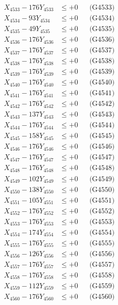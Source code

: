 \documentclass[a4paper,10pt]{article}
\begin{document}
{\begin{align}
X_{4533} - 176Y_{4533} &\leq +0 && \text{(G4533)} \\
X_{4534} - 93Y_{4534} &\leq +0 && \text{(G4534)} \\
X_{4535} - 49Y_{4535} &\leq +0 && \text{(G4535)} \\
X_{4536} - 176Y_{4536} &\leq +0 && \text{(G4536)} \\
X_{4537} - 176Y_{4537} &\leq +0 && \text{(G4537)} \\
X_{4538} - 176Y_{4538} &\leq +0 && \text{(G4538)} \\
X_{4539} - 176Y_{4539} &\leq +0 && \text{(G4539)} \\
X_{4540} - 176Y_{4540} &\leq +0 && \text{(G4540)} \\
\allowbreak
X_{4541} - 176Y_{4541} &\leq +0 && \text{(G4541)} \\
X_{4542} - 176Y_{4542} &\leq +0 && \text{(G4542)} \\
X_{4543} - 137Y_{4543} &\leq +0 && \text{(G4543)} \\
X_{4544} - 176Y_{4544} &\leq +0 && \text{(G4544)} \\
X_{4545} - 158Y_{4545} &\leq +0 && \text{(G4545)} \\
X_{4546} - 176Y_{4546} &\leq +0 && \text{(G4546)} \\
X_{4547} - 176Y_{4547} &\leq +0 && \text{(G4547)} \\
X_{4548} - 176Y_{4548} &\leq +0 && \text{(G4548)} \\
X_{4549} - 102Y_{4549} &\leq +0 && \text{(G4549)} \\
X_{4550} - 138Y_{4550} &\leq +0 && \text{(G4550)} \\
\allowbreak
X_{4551} - 105Y_{4551} &\leq +0 && \text{(G4551)} \\
X_{4552} - 176Y_{4552} &\leq +0 && \text{(G4552)} \\
X_{4553} - 176Y_{4553} &\leq +0 && \text{(G4553)} \\
X_{4554} - 174Y_{4554} &\leq +0 && \text{(G4554)} \\
X_{4555} - 176Y_{4555} &\leq +0 && \text{(G4555)} \\
X_{4556} - 126Y_{4556} &\leq +0 && \text{(G4556)} \\
X_{4557} - 176Y_{4557} &\leq +0 && \text{(G4557)} \\
X_{4558} - 176Y_{4558} &\leq +0 && \text{(G4558)} \\
X_{4559} - 112Y_{4559} &\leq +0 && \text{(G4559)} \\
X_{4560} - 176Y_{4560} &\leq +0 && \text{(G4560)} \\

\end{align}}
\end{document}
